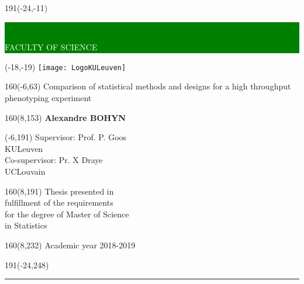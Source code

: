 \thispagestyle{empty}
\newcommand{\form}[1]{\scalebox{1.087}{\boldmath{#1}}}

%
\begin{textblock}{191}(-24,-11)
\colorbox{green}{\hspace{139mm}\ \parbox[c][18truemm]{52mm}{\textcolor{white}{FACULTY OF SCIENCE}}}
\end{textblock}
%
\begin{textblock}{70}(-18,-19)
\textblockcolour{}
\texttt{[image: LogoKULeuven]}
\end{textblock}
%
\begin{textblock}{160}(-6,63)
\textblockcolour{}
\vspace{-\parskip}
\flushleft
\fontsize{40}{42}\selectfont \textcolor{bluetitle}{Comparison of statistical methods and designs for a high throughput phenotyping experiment}\\[1.5mm]
\end{textblock}
%
\begin{textblock}{160}(8,153)
\textblockcolour{}
\vspace{-\parskip}
\flushright
\fontsize{14}{16}\selectfont \textbf{Alexandre BOHYN}
\end{textblock}
%
\begin{textblock}{70}(-6,191)
\textblockcolour{}
\vspace{-\parskip}
\flushleft
Supervisor: Prof. P. Goos\\[-2pt]
\textcolor{blueaff}{KULeuven}\\[5pt]
Co-supervisor: Pr. X Draye\\[-2pt]
\textcolor{blueaff}{UCLouvain}\\[5pt]
\end{textblock}
%
\begin{textblock}{160}(8,191)
\textblockcolour{}
\vspace{-\parskip}
\flushright
Thesis presented in\\[4.5pt]
fulfillment of the requirements\\[4.5pt]
for the degree of Master of Science\\[4.5pt]
in Statistics\\
\end{textblock}
%
\begin{textblock}{160}(8,232)
\textblockcolour{}
\vspace{-\parskip}
\flushright
Academic year 2018-2019
\end{textblock}
%
\begin{textblock}{191}(-24,248)
{\color{blueline}\rule{550pt}{5.5pt}}
\end{textblock}
%
\vfill

